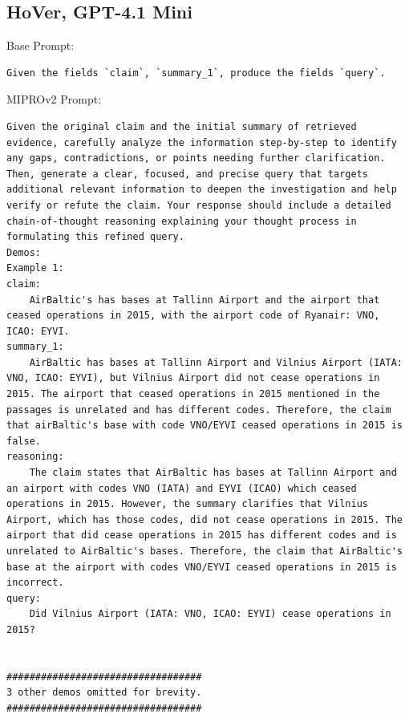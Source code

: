 \subsection{HoVer, GPT-4.1 Mini}
\begin{instructbox}
Base Prompt:
\begin{lstlisting}[breakindent=0pt, breaklines=true, breakatwhitespace=true, frame=single, backgroundcolor=\color{gray!10}]
Given the fields `claim`, `summary_1`, produce the fields `query`.
\end{lstlisting}

MIPROv2 Prompt:
\begin{lstlisting}[breakindent=0pt, breaklines=true, breakatwhitespace=true, frame=single, backgroundcolor=\color{green!10}]
Given the original claim and the initial summary of retrieved evidence, carefully analyze the information step-by-step to identify any gaps, contradictions, or points needing further clarification. Then, generate a clear, focused, and precise query that targets additional relevant information to deepen the investigation and help verify or refute the claim. Your response should include a detailed chain-of-thought reasoning explaining your thought process in formulating this refined query.
Demos:
Example 1:
claim:
    AirBaltic's has bases at Tallinn Airport and the airport that ceased operations in 2015, with the airport code of Ryanair: VNO, ICAO: EYVI.
summary_1:
    AirBaltic has bases at Tallinn Airport and Vilnius Airport (IATA: VNO, ICAO: EYVI), but Vilnius Airport did not cease operations in 2015. The airport that ceased operations in 2015 mentioned in the passages is unrelated and has different codes. Therefore, the claim that airBaltic's base with code VNO/EYVI ceased operations in 2015 is false.
reasoning:
    The claim states that AirBaltic has bases at Tallinn Airport and an airport with codes VNO (IATA) and EYVI (ICAO) which ceased operations in 2015. However, the summary clarifies that Vilnius Airport, which has those codes, did not cease operations in 2015. The airport that did cease operations in 2015 has different codes and is unrelated to AirBaltic's bases. Therefore, the claim that AirBaltic's base at the airport with codes VNO/EYVI ceased operations in 2015 is incorrect.
query:
    Did Vilnius Airport (IATA: VNO, ICAO: EYVI) cease operations in 2015?


##################################
3 other demos omitted for brevity.
##################################


\end{lstlisting}
\end{instructbox}
